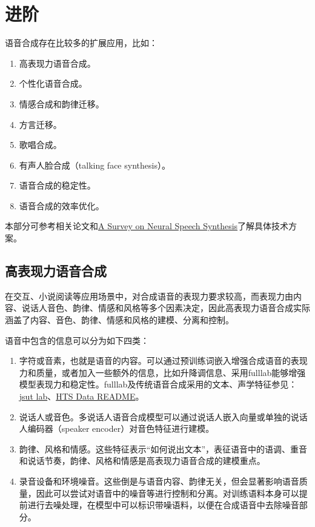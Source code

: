 \documentclass[cn,10pt,math=newtx,citestyle=gb7714-2015,bibstyle=gb7714-2015]{elegantbook}
\begin{document}
\section{进阶}

语音合成存在比较多的扩展应用，比如：

\begin{enumerate}
  \item 高表现力语音合成。
  \item 个性化语音合成。
  \item 情感合成和韵律迁移。
  \item 方言迁移。
  \item 歌唱合成。
  \item 有声人脸合成（talking face synthesis）。
  \item 语音合成的稳定性。
  \item 语音合成的效率优化。
\end{enumerate}

本部分可参考相关论文和\href{https://arxiv.org/abs/2106.15561}{A Survey on Neural Speech Synthesis}了解具体技术方案。

\subsection{高表现力语音合成}

在交互、小说阅读等应用场景中，对合成语音的表现力要求较高，而表现力由内容、说话人音色、韵律、情感和风格等多个因素决定，因此高表现力语音合成实际涵盖了内容、音色、韵律、情感和风格的建模、分离和控制。

语音中包含的信息可以分为如下四类：

\begin{enumerate}
  \item 字符或音素，也就是语音的内容。可以通过预训练词嵌入增强合成语音的表现力和质量，或者加入一些额外的信息，比如升降调信息、采用fulllab能够增强模型表现力和稳定性。fulllab及传统语音合成采用的文本、声学特征参见：\href{https://github.com/r9y9/jsut-lab}{jsut lab}、\href{https://github.com/feelins/HTS-Project/blob/master/data/README}{HTS Data README}。
  \item 说话人或音色。多说话人语音合成模型可以通过说话人嵌入向量或单独的说话人编码器（speaker encoder）对音色特征进行建模。
  \item 韵律、风格和情感。这些特征表示“如何说出文本”，表征语音中的语调、重音和说话节奏，韵律、风格和情感是高表现力语音合成的建模重点。
  \item 录音设备和环境噪音。这些倒是与语音内容、韵律无关，但会显著影响语音质量，因此可以尝试对语音中的噪音等进行控制和分离。对训练语料本身可以提前进行去噪处理，在模型中可以标识带噪语料，以便在合成语音中去除噪音部分。
\end{enumerate}
\end{document}
